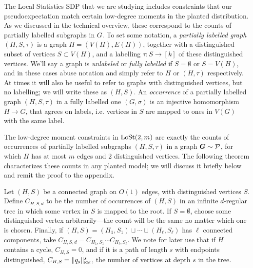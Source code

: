 The Local Statistics SDP that we are studying includes constraints that our pseudoexpectation match certain low-degree moments in the planted distribution. As we discussed in the technical overview, these correspond to the counts of partially labelled subgraphs in $G$. To set some notation, a \textit{partially labelled graph} $(H,S,\tau)$ is a graph $H = (V(H),E(H))$, together with a distinguished subset of vertices $S \subset V(H)$, and a labelling $\tau : S \to [k]$ of these distinguished vertices. We'll say a graph is \emph{unlabeled} or \textit{fully labelled} if $S = \emptyset$ or $S = V(H)$, and in these cases abuse notation and simply refer to $H$ or $(H,\tau)$ respectively. At times it will also be useful to refer to graphs with distinguished vertices, but no labelling; we will write these as $(H,S)$. An \textit{occurrence} of a partially labelled graph $(H,S,\tau)$ in a fully labelled one $(G,\sigma)$ is an injective homomorphism $H \to G$, that agrees on labels, i.e. vertices in $S$ are mapped to ones in $V(G)$ with the same label.

The low-degree moment constraints in $\operatorname{LoSt}(2,m)$ are exactly the counts of occurrences of partially labelled subgraphs $(H,S,\tau)$ in a graph $\boldsymbol{G} \sim \mathcal{P}$, for which $H$ has at most $m$ edges and $2$ distinguished vertices. The following theorem characterizes these counts in any planted model; we will discuss it briefly below and remit the proof to the appendix.

\begin{definition}
    Let $(H,S)$ be a connected graph on $O(1)$ edges, with distinguished vertices $S$. Define $C_{H,S,d}$ to be the number of occurrences of $(H,S)$ in an infinite $d$-regular tree in which some vertex in $S$ is mapped to the root. If $S = \emptyset$, choose some distinguished vertex arbitrarily---the count will be the same no matter which one is chosen. Finally, if $(H,S) = (H_1,S_1) \sqcup \cdots \sqcup (H_\ell,S_\ell)$ has $\ell$ connected components, take $C_{H,S,d} = C_{H_1,S_1} \cdots C_{H_\ell,S_\ell}$. We note for later use that if $H$ contains a cycle, $C_{H,S} = 0$, and if it is a path of length $s$ with endpoints distinguished, $C_{H,S} = \|q_s\|^s_{\textsc{km}}$, the number of vertices at depth $s$ in the tree.
\end{definition}

